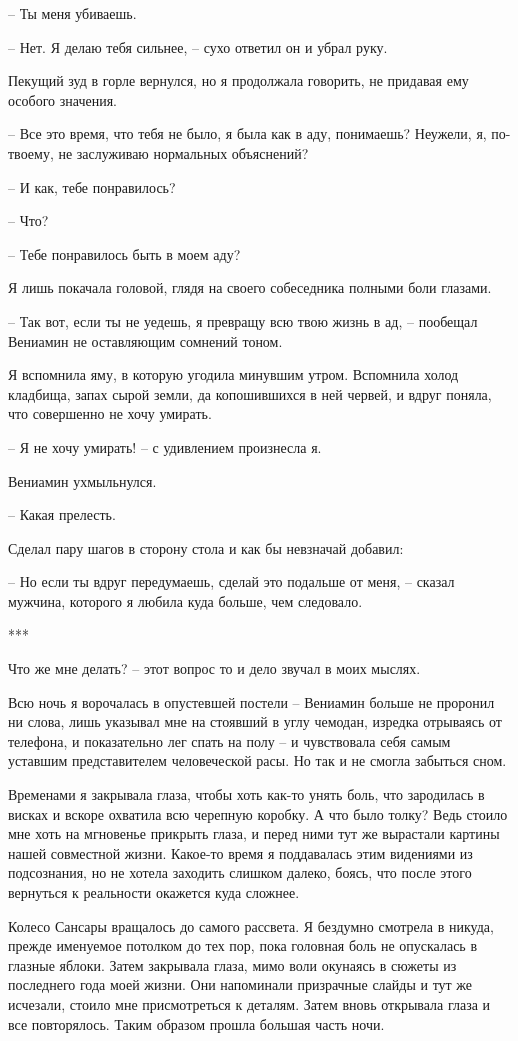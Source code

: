 \documentclass[
]{book}
\begin{document}
-- Ты меня убиваешь.

-- Нет. Я делаю тебя сильнее, -- сухо ответил он и убрал руку.

Пекущий зуд в горле вернулся, но я продолжала говорить, не придавая ему особого значения.

-- Все это время, что тебя не было, я была как в аду, понимаешь? Неужели, я, по-твоему, не заслуживаю нормальных объяснений?

-- И как, тебе понравилось?

-- Что?

-- Тебе понравилось быть в моем аду?

Я лишь покачала головой, глядя на своего собеседника полными боли глазами.

-- Так вот, если ты не уедешь, я превращу всю твою жизнь в ад, -- пообещал Вениамин не оставляющим сомнений тоном.

Я вспомнила яму, в которую угодила минувшим утром. Вспомнила холод кладбища, запах сырой земли, да копошившихся в ней червей, и вдруг поняла, что совершенно не хочу умирать.

-- Я не хочу умирать! -- с удивлением произнесла я.

Вениамин ухмыльнулся.

-- Какая прелесть.

Сделал пару шагов в сторону стола и как бы невзначай добавил:

-- Но если ты вдруг передумаешь, сделай это подальше от меня, -- сказал мужчина, которого я любила куда больше, чем следовало.

***

Что же мне делать? -- этот вопрос то и дело звучал в моих мыслях.

Всю ночь я ворочалась в опустевшей постели -- Вениамин больше не проронил ни слова, лишь указывал мне на стоявший в углу чемодан, изредка отрываясь от телефона, и показательно лег спать на полу -- и чувствовала себя самым уставшим представителем человеческой расы. Но так и не смогла забыться сном.

Временами я закрывала глаза, чтобы хоть как-то унять боль, что зародилась в висках и вскоре охватила всю черепную коробку. А что было толку? Ведь стоило мне хоть на мгновенье прикрыть глаза, и перед ними тут же вырастали картины нашей совместной жизни. Какое-то время я поддавалась этим видениями из подсознания, но не хотела заходить слишком далеко, боясь, что после этого вернуться к реальности окажется куда сложнее.

Колесо Сансары вращалось до самого рассвета. Я бездумно смотрела в никуда, прежде именуемое потолком до тех пор, пока головная боль не опускалась в глазные яблоки. Затем закрывала глаза, мимо воли окунаясь в сюжеты из последнего года моей жизни. Они напоминали призрачные слайды и тут же исчезали, стоило мне присмотреться к деталям. Затем вновь открывала глаза и все повторялось. Таким образом прошла большая часть ночи.
\end{document}

